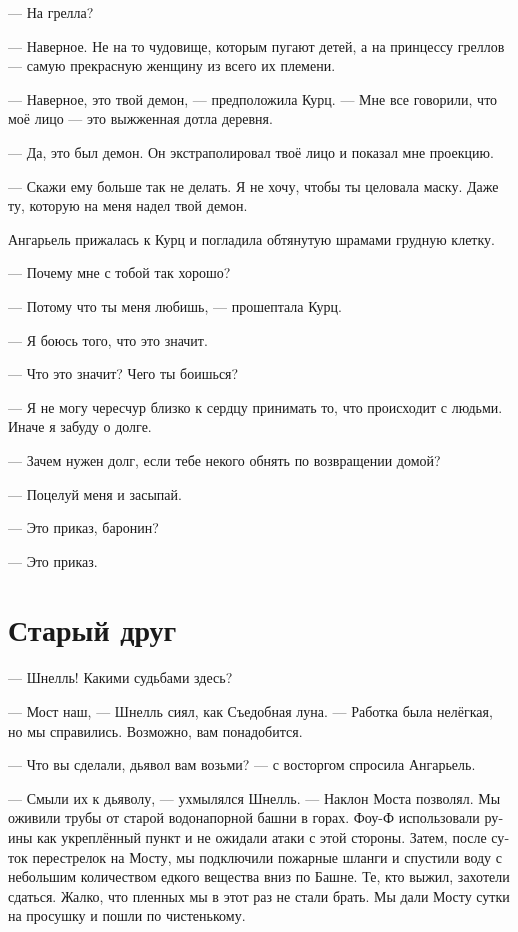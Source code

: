 \documentclass[a4paper,12pt,fleqn]{book}\usepackage{cooltooltips}\usepackage{polyglossia}\setdefaultlanguage[babelshorthands=true]{russian}\setotherlanguage{english}\defaultfontfeatures{Ligatures=TeX,Mapping=tex-text} \usepackage{xcolor}\definecolor{lightgray}{HTML}{bbbbbb}\color{lightgray}\newcommand{\ml}[3]{\textenglish{\textcolor{black}{#3}}}
\begin{document}
--- На грелла?

--- Наверное.
Не на то чудовище, которым пугают детей, а на принцессу греллов --- самую прекрасную женщину из всего их племени.

--- Наверное, это твой демон, --- предположила Курц.
--- Мне все говорили, что моё лицо --- это выжженная дотла деревня.

--- Да, это был демон.
Он экстраполировал твоё лицо и показал мне проекцию.

--- Скажи ему больше так не делать.
Я не хочу, чтобы ты целовала маску.
Даже ту, которую на меня надел твой демон.

Ангарьель прижалась к Курц и погладила обтянутую шрамами грудную клетку.

--- Почему мне с тобой так хорошо?

--- Потому что ты меня любишь, --- прошептала Курц.

--- Я боюсь того, что это значит.

--- Что это значит?
Чего ты боишься?

--- Я не могу чересчур близко к сердцу принимать то, что происходит с людьми.
Иначе я забуду о долге.

--- Зачем нужен долг, если тебе некого обнять по возвращении домой?

--- Поцелуй меня и засыпай.

--- Это приказ, баронин?

--- Это приказ.

\section{Старый друг}

--- Шнелль!
Какими судьбами здесь?

--- Мост наш, --- Шнелль сиял, как Съедобная луна.
--- Работка была нелёгкая, но мы справились.
Возможно, вам понадобится.

--- Что вы сделали, дьявол вам возьми? --- с восторгом спросила Ангарьель.

--- Смыли их к дьяволу, --- ухмылялся Шнелль.
--- Наклон Моста позволял.
Мы оживили трубы от старой водонапорной башни в горах.
Фоу-Ф использовали руины как укреплённый пункт и не ожидали атаки с этой стороны.
Затем, после суток перестрелок на Мосту, мы подключили пожарные шланги и спустили воду с небольшим количеством едкого вещества вниз по Башне.
Те, кто выжил, захотели сдаться.
Жалко, что пленных мы в этот раз не стали брать.
Мы дали Мосту сутки на просушку и пошли по чистенькому.
\end{document}
